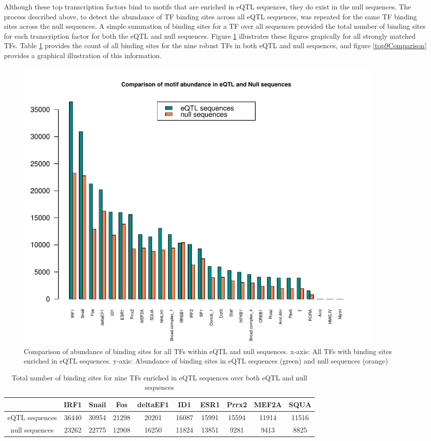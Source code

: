 \documentclass[12pt]{article}
\begin{document}
Although these top transcription factors bind to motifs that are enriched in eQTL sequences, they do exist in the null sequences. The process described above, to detect the abundance of TF binding sites across all eQTL sequences, was repeated for the same TF binding sites across the null sequences. A simple summation of binding sites for a TF over all sequences provided the total number of binding sites for each transcription factor for both the eQTL and null sequences. Figure \ref{allMotifComparison} illustrates these figures grapically for all strongly matched TFs. Table \ref{TFnos} provides the count of all binding sites for the nine robust TFs in both eQTL and null sequences, and figure \ref{top9Comparison} provides a graphical illustration of this information.


\begin{figure}[!htbp]
\centering
\includegraphics[width= 0.9\textwidth]{AllMotifComparison.pdf} 
\caption{Comparison of abundance of binding sites for all TFs within eQTL and null sequences. x-axis: All TFs with binding sites enriched in eQTL sequences. y-axis: Abundance of binding sites in eQTL sequences (green) and null sequences (orange)} 
\label{allMotifComparison}
\end{figure}

\begin{table}[!htbp]
\caption{Total number of binding sites for nine TFs enriched in eQTL sequences over both eQTL and null sequences}
\label{TFnos}
\centering
\begin{tabular}{cccccccccc}
\toprule[0.2em]
& IRF1 & Snail & Fos & deltaEF1 & ID1 & ESR1 & Prrx2 & MEF2A & SQUA\\
\midrule[0.1em]
 eQTL sequences & 36440 & 30954 & 21298 & 20201 & 16087 & 15991 & 15594 & 11914 & 11516\\
 null sequences & 23262 & 22775 & 12908 & 16250 & 11824 & 13851 & 9281 & 9413 & 8825\\
 \bottomrule[0.2em]
\end{tabular}
\end{table}
 
\end{document}
